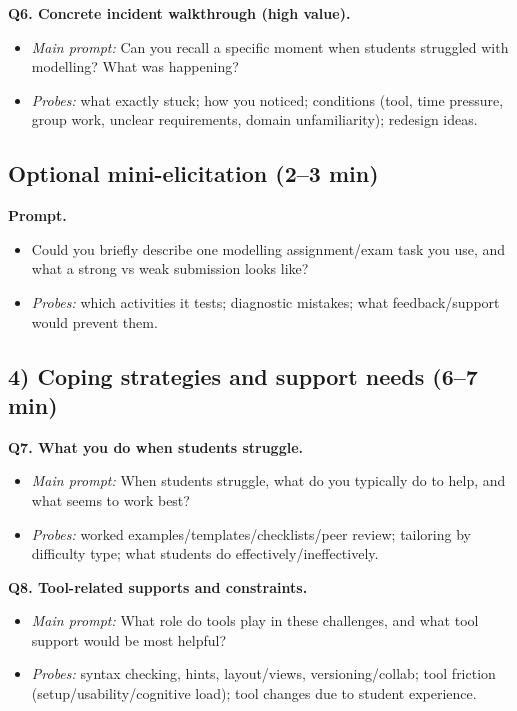 \textbf{Q6. Concrete incident walkthrough (high value).}
\begin{itemize}
  \item \emph{Main prompt:} Can you recall a specific moment when students struggled with modelling? What was happening?
  \item \emph{Probes:} what exactly stuck; how you noticed; conditions (tool, time pressure, group work, unclear requirements, domain unfamiliarity); redesign ideas.
\end{itemize}

\subsection*{Optional mini-elicitation (2--3 min)}
\textbf{Prompt.}
\begin{itemize}
  \item Could you briefly describe one modelling assignment/exam task you use, and what a strong vs weak submission looks like?
  \item \emph{Probes:} which activities it tests; diagnostic mistakes; what feedback/support would prevent them.
\end{itemize}

\subsection*{4) Coping strategies and support needs (6--7 min)}
\textbf{Q7. What you do when students struggle.}
\begin{itemize}
  \item \emph{Main prompt:} When students struggle, what do you typically do to help, and what seems to work best?
  \item \emph{Probes:} worked examples/templates/checklists/peer review; tailoring by difficulty type; what students do effectively/ineffectively.
\end{itemize}

\textbf{Q8. Tool-related supports and constraints.}
\begin{itemize}
  \item \emph{Main prompt:} What role do tools play in these challenges, and what tool support would be most helpful?
  \item \emph{Probes:} syntax checking, hints, layout/views, versioning/collab; tool friction (setup/usability/cognitive load); tool changes due to student experience.
\end{itemize}

